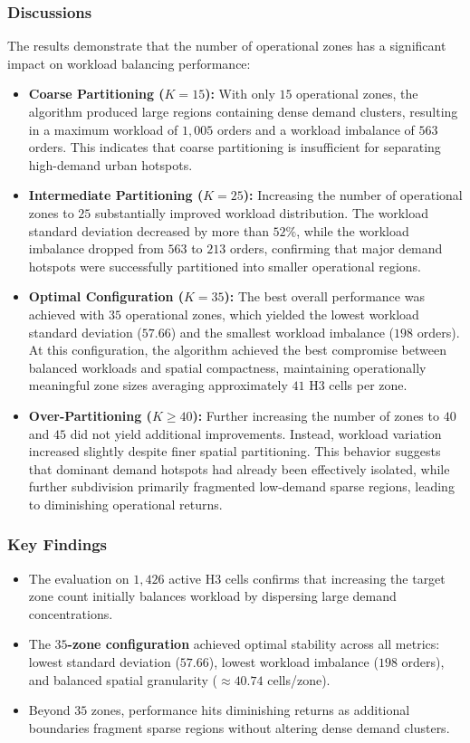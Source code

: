\documentclass{article}
\begin{document}
\subsubsection{Discussions}
The results demonstrate that the number of operational zones has a significant impact on workload balancing performance:
\begin{itemize}
    \item \textbf{Coarse Partitioning ($K = 15$):} With only $15$ operational zones, the algorithm produced large regions containing dense demand clusters, resulting in a maximum workload of $1,005$ orders and a workload imbalance of $563$ orders. This indicates that coarse partitioning is insufficient for separating high-demand urban hotspots.
    \item \textbf{Intermediate Partitioning ($K = 25$):} Increasing the number of operational zones to $25$ substantially improved workload distribution. The workload standard deviation decreased by more than $52\%$, while the workload imbalance dropped from $563$ to $213$ orders, confirming that major demand hotspots were successfully partitioned into smaller operational regions.
    \item \textbf{Optimal Configuration ($K = 35$):} The best overall performance was achieved with $35$ operational zones, which yielded the lowest workload standard deviation ($57.66$) and the smallest workload imbalance ($198$ orders). At this configuration, the algorithm achieved the best compromise between balanced workloads and spatial compactness, maintaining operationally meaningful zone sizes averaging approximately $41$ H3 cells per zone.
    \item \textbf{Over-Partitioning ($K \ge 40$):} Further increasing the number of zones to $40$ and $45$ did not yield additional improvements. Instead, workload variation increased slightly despite finer spatial partitioning. This behavior suggests that dominant demand hotspots had already been effectively isolated, while further subdivision primarily fragmented low-demand sparse regions, leading to diminishing operational returns.
\end{itemize}

\subsubsection{Key Findings}
\begin{itemize}
    \item The evaluation on $1,426$ active H3 cells confirms that increasing the target zone count initially balances workload by dispersing large demand concentrations.
    \item The \textbf{$35$-zone configuration} achieved optimal stability across all metrics: lowest standard deviation ($57.66$), lowest workload imbalance ($198$ orders), and balanced spatial granularity ($\approx 40.74$ cells/zone).
    \item Beyond $35$ zones, performance hits diminishing returns as additional boundaries fragment sparse regions without altering dense demand clusters.
\end{itemize}
\end{document}
